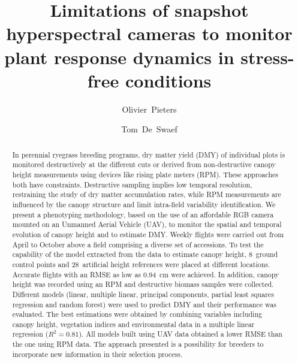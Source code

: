 \documentclass[10pt,authoryear,a4paper]{elsarticle}
\begin{document}
\begin{frontmatter}

    \title{Limitations of snapshot hyperspectral cameras to monitor plant response dynamics in stress-free conditions}
    
    \author[a,b]{Olivier~Pieters}
    
    \author[b]{Tom~De~Swaef}
    
    
    \address[a]{IDLab-AIRO -- Ghent University -- imec, Technologiepark-Zwijnaarde 126, 9052 Zwijnaarde, Belgium}
    \address[b]{Plant Sciences Unit, Flanders Research Institute for Agriculture, Fisheries and Food, Caritasstraat 39, 9090 Melle, Belgium}
    
    \begin{abstract}  
        In perennial ryegrass breeding programs, dry matter yield (DMY) of
        individual plots is monitored destructively at the different cuts or
        derived from non-destructive canopy height measurements using devices
        like rising plate meters (RPM). These approaches both have constraints.
        Destructive sampling implies low temporal resolution, restraining the
        study of dry matter accumulation rates, while RPM measurements are
        influenced by the canopy structure and limit intra-field variability
        identification. We present a phenotyping methodology, based on the use
        of an affordable RGB camera mounted on an Unmanned Aerial Vehicle (UAV),
        to monitor the spatial and temporal evolution of canopy height and to
        estimate DMY. Weekly flights were carried out from April to October
        above a field comprising a diverse set of accessions. To test the
        capability of the model extracted from the data to estimate canopy height, 8~ground control
        points and 28~artificial height references were placed at different
        locations. Accurate flights with an RMSE as low as 0.94~cm were
        achieved. In addition, canopy height was recorded using an RPM and
        destructive biomass samples were collected. Different models (linear,
        multiple linear, principal components, partial least squares regression
        and random forest) were used to predict DMY and their performance was
        evaluated. The best estimations were obtained by combining variables
        including canopy height, vegetation indices and environmental data in a
        multiple linear regression (${R^2 = 0.81}$). All models built using UAV data
        obtained a lower RMSE than the one using RPM data. The approach
        presented is a possibility for breeders to incorporate new information
        in their selection process.
    \end{abstract}
    

\end{frontmatter}
\end{document}
